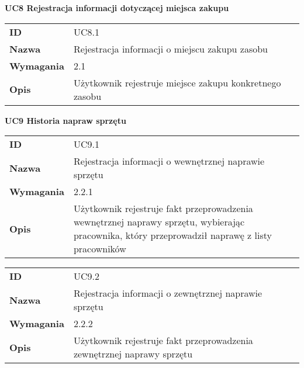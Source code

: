 \vspace{.03\textheight}
\begin{center}
  {\Large\bf UC8 Rejestracja informacji dotyczącej miejsca zakupu} \\
\end{center}
\vspace{.02\textheight}


\begin{tabular}{p{}p{}}
\hfill {\bf ID} & UC8.1 \\
\hfill {\bf Nazwa} & Rejestracja informacji o miejscu zakupu zasobu  \\
\hfill {\bf Wymagania} &  2.1 \\
\hfill {\bf Opis} &  Użytkownik rejestruje miejsce zakupu konkretnego zasobu \\
\end{tabular}

\vspace{.03\textheight}
\begin{center}
  {\Large\bf UC9 Historia napraw sprzętu} \\
\end{center}
\vspace{.02\textheight}

\begin{tabular}{p{}p{}}
\hfill {\bf ID} & UC9.1 \\
\hfill {\bf Nazwa} & Rejestracja informacji o wewnętrznej naprawie sprzętu \\
\hfill {\bf Wymagania} &  2.2.1 \\
\hfill {\bf Opis} & Użytkownik rejestruje fakt przeprowadzenia wewnętrznej naprawy sprzętu, wybierając pracownika, który przeprowadził naprawę z listy pracowników \\
\end{tabular}

\vspace{.05\textheight}

\begin{tabular}{p{}p{}}
\hfill {\bf ID} & UC9.2 \\
\hfill {\bf Nazwa} &  Rejestracja informacji o zewnętrznej naprawie sprzętu \\
\hfill {\bf Wymagania} &  2.2.2 \\
\hfill {\bf Opis} &  Użytkownik rejestruje fakt przeprowadzenia zewnętrznej naprawy sprzętu \\
\end{tabular}

